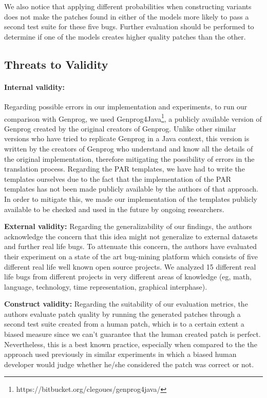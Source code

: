 \documentclass[conference]{IEEEtran}
\begin{document}
We also notice that applying different probabilities when constructing variants
does not make the patches found in either of the models more likely to pass a
second test suite for these five bugs. Further evaluation should be performed to
determine if one of the models creates higher quality patches than the other. 
  
\subsection{Threats to Validity} \label{threatsVal}

\paragraph{Internal validity:}
Regarding possible errors in our implementation and experiments, to run our comparison with Genprog, we used Genprog4Java\footnote{https://bitbucket.org/clegoues/genprog4java/}, a publicly available version of Genprog created by the original creators of Genprog. Unlike other similar versions who have tried to replicate Genprog in a Java context, this version is written by the creators of Genprog who understand and know all the details of the original implementation, therefore mitigating the possibility of errors in the translation process. Regarding the PAR templates, we have had to write the templates ourselves due to the fact that the implementation of the PAR templates has not been made publicly available by the authors of that approach. In order to mitigate this, we made our implementation of the templates publicly available 
to be checked and used in the future by ongoing researchers.

\textbf{External validity:} 
Regarding the generalizability of our findings, the authors acknowledge the concern that this idea might not generalize to external datasets and further real life bugs. To attenuate this concern, the authors have evaluated their experiment on a state of the art bug-mining platform which consists of five different real life well known open source projects. We analyzed 15 different real life bugs from different projects in very different areas of knowledge (eg, math, language, technology, time representation, graphical interphase). 

\textbf{Construct validity:}
Regarding the suitability of our evaluation metrics, the authors evaluate patch quality by running the generated patches through a second test suite created from a human patch, which is to a certain extent a biased measure since we can't guarantee that the human created patch is perfect. Nevertheless, this is a best known practice, especially when compared to the the approach used previously in similar experiments in which a biased human developer would judge whether he/she considered the patch was correct or not.
\end{document}
